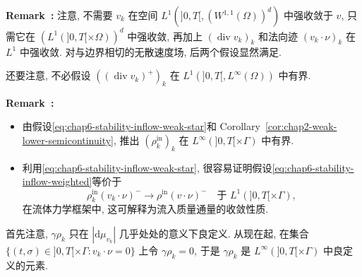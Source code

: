 \begin{sloppypar}
\par\noindent{}\textbf{Remark~\thechaptersixsectiononeremark:}\label{rem:chap6-stability-weak-velocity-requirement}
注意, 不需要 $v_k$ 在空间 $L^1(]0,T[,(W^{1,1}(\Omega))^d)$ 中强收敛于 $v$, 只需它在 $(L^1(]0,T[\times\Omega))^d$ 中强收敛, 再加上 $(\operatorname{div}v_k)_k$ 和法向迹 $(v_k\cdot\nu)_k$ 在 $L^1$ 中强收敛. 对与边界相切的无散速度场, 后两个假设显然满足.

还要注意, 不必假设 $((\operatorname{div}v_k)^+)_k$ 在 $L^1(]0,T[,L^\infty(\Omega))$ 中有界.

\par\noindent{}\textbf{Remark~\thechaptersixsectiononeremark:}\label{rem:chap6-stability-inflow-assumptions}
\begin{itemize}
 \item 由假设\eqref{eq:chap6-stability-inflow-weak-star}和 Corollary~\ref{cor:chap2-weak-lower-semicontinuity}, 推出 $(\rho_k^{\mathrm{in}})_k$ 在 $L^\infty(]0,T[\times\Gamma)$ 中有界.
 \item 利用\eqref{eq:chap6-stability-inflow-weak-star}, 很容易证明假设\eqref{eq:chap6-stability-inflow-weighted}等价于
 \[
  \rho_k^{\mathrm{in}}(v_k\cdot\nu)^-\longrightarrow
  \rho^{\mathrm{in}}(v\cdot\nu)^-
  \quad\text{于 }L^1(]0,T[\times\Gamma),
 \]
 在流体力学框架中, 这可解释为流入质量通量的收敛性质.
\end{itemize}

\begin{Proof}
首先注意, $\gamma\rho_k$ 只在 $|\mathrm d\mu_{v_k}|$ 几乎处处的意义下良定义. 从现在起, 在集合
$\{(t,\sigma)\in]0,T[\times\Gamma:v_k\cdot\nu=0\}$ 上令 $\gamma\rho_k=0$, 于是 $\gamma\rho_k$ 是 $L^\infty(]0,T[\times\Gamma)$ 中良定义的元素.


\end{Proof}
\end{sloppypar}
